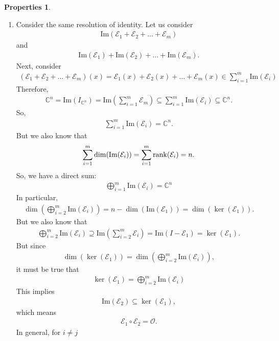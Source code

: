 \documentclass{article}
\theoremstyle{definition}
\newtheorem{prop}{Properties}[section]
\newcommand{\E}{\mathcal{E}}
\newcommand{\ima}{\text{Im}}
\begin{document}
\begin{prop}
\begin{enumerate}
	\item Consider the same resolution of identity. Let us consider 
	\begin{align*}
	\ima(\E_1 + \E_2 + \dots + \E_m)
	\end{align*}
	and
	\begin{align*}
	\ima(\E_1) + \ima(\E_2) + \dots + \ima(\E_m).
	\end{align*}
	Next, consider
	\begin{align*}
	(\E_1 + \E_2 + \dots + \E_m)(x) = \E_1(x) + \E_2(x) + \dots + \E_m(x) \in \sum^m_{i=1}\ima(\E_i)
	\end{align*}
	Therefore,
	\begin{align*}
	\mathbb{C}^n = \ima(I_{\mathbb{C}^n}) = \ima\left( \sum^m_{i=1}\E_m \right) \subseteq \sum^m_{i=1}\ima(\E_i) \subseteq \mathbb{C}^n.
	\end{align*}
	So,
	\begin{align*}
	\sum^m_{i=1}\ima(\E_i) = \mathbb{C}^n.
	\end{align*}
	But we also know that
	\begin{align*}
	\sum^m_{i=1}\dim(\ima(\E_i)) = \sum^m_{i=1}\rank(\E_i) = n.
	\end{align*}
	So, we have a direct sum:
	\begin{align*}
	\boxed{\bigoplus^m_{i=1} \ima(\E_i) = \mathbb{C}^n}
	\end{align*}
	In particular,
	\begin{align*}
	\dim\left( \bigoplus^m_{i=2} \ima(\E_i)  \right) = n - \dim(\ima(\E_1)) = \dim(\ker(\E_1)).
	\end{align*}
	But we also know that 
	\begin{align*}
	\bigoplus^m_{i=2} \ima(\E_i) \supseteq \ima \left( \sum^m_{i=2}\E_i \right) = \ima(I - \E_1) = \ker(\E_1).
	\end{align*}
	But since
	\begin{align*}
	\dim(\ker(\E_1)) = \dim\left( \bigoplus^m_{i=2} \ima(\E_i)  \right), 
	\end{align*}
	it must be true that
	\begin{align*}
	\boxed{\ker(\E_1) = \bigoplus^m_{i=2} \ima(\E_i)}
	\end{align*}
	This implies
	\begin{align*}
	\ima(\E_2) \subseteq \ker(\E_1),
	\end{align*}
	which means
	\begin{align*}
	\E_1 \circ \E_2 = \mathcal{O}.
	\end{align*}
	In general, for $i \neq j$

\end{enumerate}
\end{prop}
\end{document}
